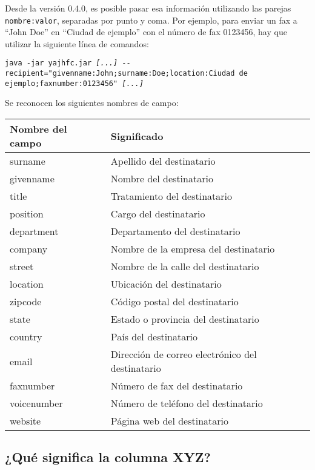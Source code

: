 \documentclass[a4paper,10pt]{scrartcl}
\begin{document}
Desde la versión 0.4.0, es posible pasar esa información utilizando las parejas \texttt{nombre:valor}, separadas por punto y coma. Por ejemplo, para enviar un fax a ``John Doe'' en ``Ciudad de ejemplo'' con el número de fax 0123456, hay que utilizar la siguiente línea de comandos:

\texttt{java -jar yajhfc.jar \textit{[...]} -{-}recipient="givenname:John;surname:Doe;location:Ciudad de ejemplo;faxnumber:0123456" \textit{[...]}}

Se reconocen los siguientes nombres de campo:
\begin{center}
\begin{tabular}{|l|p{}|}
\hline
\bfseries Nombre del campo & \bfseries Significado \\
\hline\hline
\ttfamily surname & Apellido del destinatario \\\hline
\ttfamily givenname & Nombre del destinatario \\\hline
\ttfamily title & Tratamiento del destinatario \\\hline
\ttfamily position & Cargo del destinatario \\\hline
\ttfamily department & Departamento del destinatario \\\hline
\ttfamily company & Nombre de la empresa del destinatario \\\hline
\ttfamily street & Nombre de la calle del destinatario \\\hline
\ttfamily location & Ubicación del destinatario \\\hline
\ttfamily zipcode & Código postal del destinatario \\\hline
\ttfamily state & Estado o provincia del destinatario\\\hline
\ttfamily country & País del destinatario \\\hline
\ttfamily email & Dirección de correo electrónico del destinatario\\\hline
\ttfamily faxnumber & Número de fax del destinatario \\\hline
\ttfamily voicenumber & Número de teléfono del destinatario \\\hline
\ttfamily website & Página web del destinatario \\\hline
\end{tabular}
\end{center}

\subsection{¿Qué significa la columna XYZ?}
\end{document}
